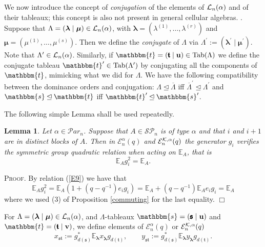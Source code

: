 \documentclass[10pt,a4,twoside,hidelinks,rm]{article}
\newcommand{\Par}{{\mathcal Par}_n}
\newcommand\es{\mathbbm{s}}
\newcommand\et{\mathbbm{t}}
\newcommand\bu{\mathbf{u}}
\newcommand\bv{\mathbf{v}}
\newcommand{\bT}{\pmb{\mathfrak{t}}}
\newcommand{\Bs}{\pmb{\mathfrak{s}}}
\newcommand{\Tab}{{\rm Tab}}
\newcommand{\Ea}{ {\mathcal E}_n^{\alpha}(q)}
\newcommand{\Eak}{ {\mathcal E}_n^{ {\cal K}, \alpha}(q)}
\newcommand\blambda{{\boldsymbol\lambda}}
\newcommand\be{\mathbb{E}}
\newcommand\bmu{{\boldsymbol\mu}}
\theoremstyle{plain}
\newtheorem{lem}[teo]{Lemma}
\newenvironment{demo}
{\textsc{Proof.}} {\quad \hfill $\Box$}
\begin{document}
\medskip
We now introduce the concept of \textit{conjugation} of the elements
of ${\cal L}_n(\alpha) $ and of their tableaux; this concept is also not present in general cellular algebras.
{}.
Suppose that $ \Lambda = (\blambda \mid \bmu ) \in {\cal L}_n(\alpha)$,  
with $ \blambda = (\lambda^{(1)}, \ldots, \lambda^{(r)}) $ and $ \bmu = (\mu^{(1)}, \ldots,\mu^{(s)})$.
Then we define the \textit{conjugate} of $ \Lambda$
via $\Lambda^\prime := (\blambda^\prime \mid \bmu^\prime ) $. 
Note that $ \Lambda^\prime \in {\cal L}_n(\alpha)$. 
Similarly, if $ \et = (\bT \mid \bu) \in  \Tab(\Lambda)$
we define the conjugate tableau $ \et^{\prime} \in \Tab(\Lambda^{\prime})$ 
by conjugating all the components of $ \et $, mimicking what we did for $ \Lambda $. 
We have the following compatibility between the dominance orders and conjugation: 
$ \Lambda \unlhd \overline{\Lambda} $ iff $ \overline{\Lambda}^\prime \unlhd {\Lambda}^\prime $ and
$ \es \unlhd \et $ iff $ \et^{\prime} \unlhd \es^{\prime} $.


\medskip


The following simple Lemma shall be used repeatedly. 
\begin{lem}{\label{simpleLemma}}
  Let $ \alpha \in \Par$. Suppose that $ A \in  \mathcal{SP}_n $ is of type $ \alpha$ 
  and that $ i $ and $i+1 $ are in distinct blocks
  of $ A$. Then in $ \Ea$ and $ \Eak $ the generator $g_i $ verifies the symmetric group quadratic relation
  when acting on $ { \be}_{A} $, that is 
  \begin{equation} { \be}_{A} g_i^2 = { \be}_{A}.
   \end{equation} 
\end{lem}
\begin{demo}
  By relation (\ref{E9}) we have that
\begin{equation}
{ \be}_{A} g_i^2 = { \be}_{A} (1+ (q-q^{-1})e_i g_i )=   \be_{A} + (q-q^{-1}) \be_{A}e_i g_i = \be_{A}
\end{equation}  
where we used (3) of Proposition \ref{commuting} for the last equality.
\end{demo}



\medskip
For $ \Lambda = (\blambda \mid \bmu ) \in {\cal L}_n(\alpha)$, and $ \Lambda$-tableaux
$\es = (\Bs \mid \bu) $ and $ \et = (\bT \mid \bv) $, we define elements of $ \Ea $ or $ \Eak$ 
\begin{equation}\label{multiMMurphy}
  x_{\Bs \bT}:=  g_{d(\Bs)}^{\ast} { \be}^{}_{\blambda} x^{}_{\blambda} g^{}_{d(\bT)},  \, \,\, \,\, \,\, \,\, \,\, \,
  y_{\Bs \bT}:=  g_{d(\Bs)}^{\ast} { \be}^{}_{\blambda}y^{}_{\blambda} g^{}_{d(\bT)}.
\end{equation}
\end{document}
